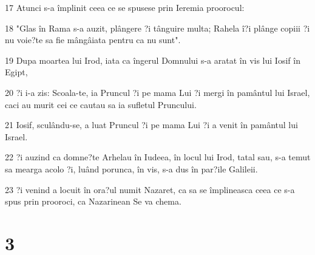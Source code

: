 \par 17 Atunci s-a împlinit ceea ce se spusese prin Ieremia proorocul:
\par 18 "Glas în Rama s-a auzit, plângere ?i tânguire multa; Rahela î?i plânge copiii ?i nu voie?te sa fie mângâiata pentru ca nu sunt".
\par 19 Dupa moartea lui Irod, iata ca îngerul Domnului s-a aratat în vis lui Iosif în Egipt,
\par 20 ?i i-a zis: Scoala-te, ia Pruncul ?i pe mama Lui ?i mergi în pamântul lui Israel, caci au murit cei ce cautau sa ia sufletul Pruncului.
\par 21 Iosif, sculându-se, a luat Pruncul ?i pe mama Lui ?i a venit în pamântul lui Israel.
\par 22 ?i auzind ca domne?te Arhelau în Iudeea, în locul lui Irod, tatal sau, s-a temut sa mearga acolo ?i, luând porunca, în vis, s-a dus în par?ile Galileii.
\par 23 ?i venind a locuit în ora?ul numit Nazaret, ca sa se împlineasca ceea ce s-a spus prin prooroci, ca Nazarinean Se va chema.

\chapter{3}


